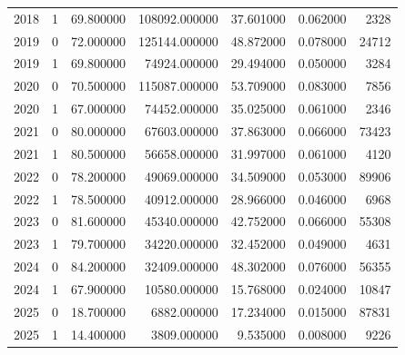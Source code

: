 \begin{tabular}{rrrrrrr}
2018 & 1 & 69.800000 & 108092.000000 & 37.601000 & 0.062000 & 2328 \\
2019 & 0 & 72.000000 & 125144.000000 & 48.872000 & 0.078000 & 24712 \\
2019 & 1 & 69.800000 & 74924.000000 & 29.494000 & 0.050000 & 3284 \\
2020 & 0 & 70.500000 & 115087.000000 & 53.709000 & 0.083000 & 7856 \\
2020 & 1 & 67.000000 & 74452.000000 & 35.025000 & 0.061000 & 2346 \\
2021 & 0 & 80.000000 & 67603.000000 & 37.863000 & 0.066000 & 73423 \\
2021 & 1 & 80.500000 & 56658.000000 & 31.997000 & 0.061000 & 4120 \\
2022 & 0 & 78.200000 & 49069.000000 & 34.509000 & 0.053000 & 89906 \\
2022 & 1 & 78.500000 & 40912.000000 & 28.966000 & 0.046000 & 6968 \\
2023 & 0 & 81.600000 & 45340.000000 & 42.752000 & 0.066000 & 55308 \\
2023 & 1 & 79.700000 & 34220.000000 & 32.452000 & 0.049000 & 4631 \\
2024 & 0 & 84.200000 & 32409.000000 & 48.302000 & 0.076000 & 56355 \\
2024 & 1 & 67.900000 & 10580.000000 & 15.768000 & 0.024000 & 10847 \\
2025 & 0 & 18.700000 & 6882.000000 & 17.234000 & 0.015000 & 87831 \\
2025 & 1 & 14.400000 & 3809.000000 & 9.535000 & 0.008000 & 9226 \\
\bottomrule
\end{tabular}
